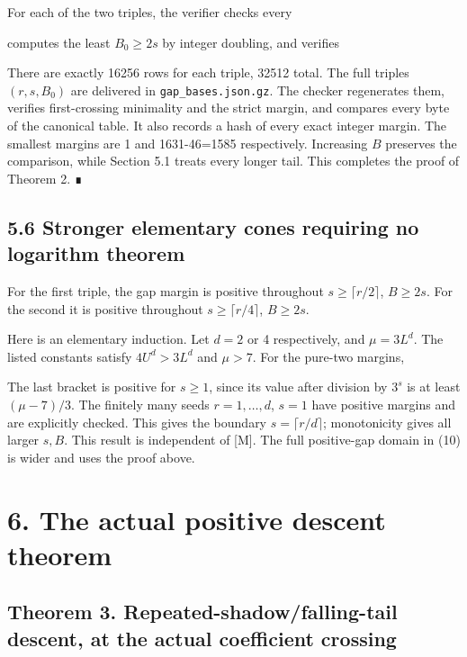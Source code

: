 For each of the two triples, the verifier checks every


computes the least \(B_0\ge2s\) by integer doubling, and verifies


There are exactly 16256 rows for each triple, 32512 total. The full
triples \((r,s,B_0)\) are delivered in \nolinkurl{gap_bases.json.gz}.
The checker regenerates them, verifies first-crossing minimality and the
strict margin, and compares every byte of the canonical table. It also
records a hash of every exact integer margin. The smallest margins are 1
and 1631-46=1585 respectively. Increasing \(B\) preserves the
comparison, while Section 5.1 treats every longer tail. This completes
the proof of Theorem 2. ∎

\subsection{5.6 Stronger elementary cones requiring no logarithm
theorem}

For the first triple, the gap margin is positive throughout
\(s\ge\lceil r/2\rceil\), \(B\ge2s\). For the second it is positive
throughout \(s\ge\lceil r/4\rceil\), \(B\ge2s\).

Here is an elementary induction. Let \(d=2\) or 4 respectively, and
\(\mu=3L^d\). The listed constants satisfy \(4U^d>3L^d\) and \(\mu>7\).
For the pure-two margins,


The last bracket is positive for \(s\ge1\), since its value after
division by \(3^s\) is at least \((\mu-7)/3\). The finitely many seeds
\(r=1,\ldots,d\), \(s=1\) have positive margins and are explicitly
checked. This gives the boundary \(s=\lceil r/d\rceil\); monotonicity
gives all larger \(s,B\). This result is independent of {[}M{]}. The
full positive-gap domain in (10) is wider and uses the proof above.

\section{6. The actual positive descent theorem}

\subsection{Theorem 3. Repeated-shadow/falling-tail descent, at the
actual coefficient crossing}

